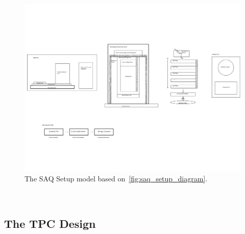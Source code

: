 \begin{figure}[]
\centering
\includegraphics[width=\textwidth]{images/SAQ_setup_diagram.pdf}
\caption{The SAQ Setup model based on~\ref{fig:saq_setup_diagram}.}
\end{figure}~\label{fig:saq_physical_setup_flatten}

\subsection{The TPC Design}

